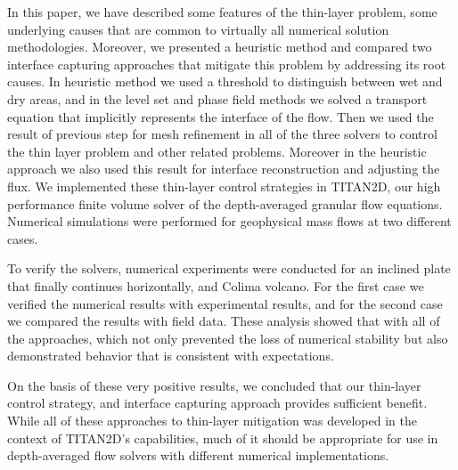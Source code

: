 \documentclass[letterpaper,10pt]{article}
\begin{document}
In this paper, we 
have described some features of the thin-layer problem,
some underlying causes that are common to virtually all numerical 
solution methodologies.  Moreover, we presented a heuristic method and compared 
two interface capturing approaches that 
mitigate this problem by addressing its root causes. In heuristic method we used a threshold to distinguish between wet and dry areas, and in the level set and phase field methods we solved a 
transport equation that implicitly represents the interface of the flow. Then we used the result of previous step for mesh refinement in all of the three solvers to control the thin layer problem and other related problems. Moreover in the heuristic approach we also used this result for interface reconstruction  and adjusting the flux. 
We implemented these thin-layer control strategies in TITAN2D, our high 
performance finite volume solver of the depth-averaged granular 
flow equations.  Numerical simulations were performed for 
geophysical mass flows at two different cases.

To verify the solvers, numerical experiments were conducted for an inclined plate that finally continues horizontally, and Colima volcano. For the first case we verified the numerical results 
with experimental results, and for the second case we compared the results with field data. These analysis showed that with all of the approaches,
which not only prevented the loss of numerical stability but also demonstrated behavior that is consistent with expectations.
%
%

On the basis of these very positive results, we concluded that our 
thin-layer control strategy, and interface capturing approach provides sufficient benefit. 
While all of these approaches to thin-layer mitigation was developed in the 
context of TITAN2D's capabilities, much of it should be appropriate 
for use in depth-averaged flow solvers with different numerical 
implementations.
\end{document}

